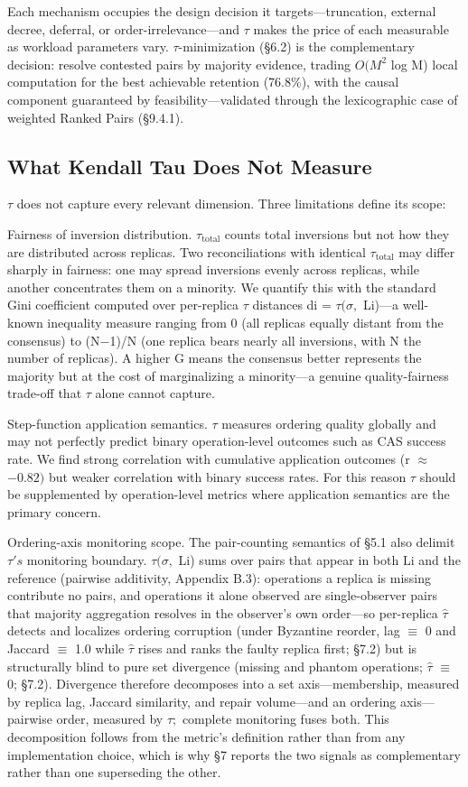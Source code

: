 \documentclass[11pt]{article}
\begin{document}
Each mechanism occupies the design decision it targets—truncation, external decree, deferral, or order-irrelevance—and $\tau $ makes the price of each measurable as workload parameters vary. $\tau $-minimization (§6.2) is the complementary decision: resolve contested pairs by majority evidence, trading $O(M^{2}$ log M) local computation for the best achievable retention (76.8\%), with the causal component guaranteed by feasibility—validated through the lexicographic case of weighted Ranked Pairs (§9.4.1).

\subsection{What Kendall Tau Does Not Measure}
$\tau $ does not capture every relevant dimension. Three limitations define its scope:

Fairness of inversion distribution. $\tau _{\mathrm{total}}$ counts total inversions but not how they are distributed across replicas. Two reconciliations with identical $\tau _{\mathrm{total}}$ may differ sharply in fairness: one may spread inversions evenly across replicas, while another concentrates them on a minority. We quantify this with the standard Gini coefficient computed over per-replica $\tau $ distances di = $\tau (\sigma ,$ Li)—a well-known inequality measure ranging from 0 (all replicas equally distant from the consensus) to (N−1)/N (one replica bears nearly all inversions, with N the number of replicas). A higher G means the consensus better represents the majority but at the cost of marginalizing a minority—a genuine quality-fairness trade-off that $\tau $ alone cannot capture.

Step-function application semantics. $\tau $ measures ordering quality globally and may not perfectly predict binary operation-level outcomes such as CAS success rate. We find strong correlation with cumulative application outcomes (r $\approx $ $-0.82)$ but weaker correlation with binary success rates. For this reason $\tau $ should be supplemented by operation-level metrics where application semantics are the primary concern.

Ordering-axis monitoring scope. The pair-counting semantics of §5.1 also delimit $\tau 's$ monitoring boundary. $\tau (\sigma ,$ Li) sums over pairs that appear in both Li and the reference (pairwise additivity, Appendix B.3): operations a replica is missing contribute no pairs, and operations it alone observed are single-observer pairs that majority aggregation resolves in the observer's own order—so per-replica $\hat{\tau}$ detects and localizes ordering corruption (under Byzantine reorder, lag $\equiv $ 0 and Jaccard $\equiv $ 1.0 while $\hat{\tau}$ rises and ranks the faulty replica first; §7.2) but is structurally blind to pure set divergence (missing and phantom operations; $\hat{\tau}$ $\equiv $ 0; §7.2). Divergence therefore decomposes into a set axis—membership, measured by replica lag, Jaccard similarity, and repair volume—and an ordering axis—pairwise order, measured by $\tau ;$ complete monitoring fuses both. This decomposition follows from the metric's definition rather than from any implementation choice, which is why §7 reports the two signals as complementary rather than one superseding the other.
\end{document}
